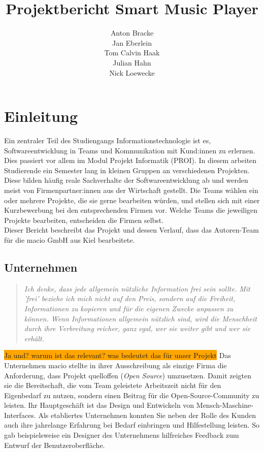 \documentclass[10pt, a4paper]{article}
\title{Projektbericht Smart Music Player}
\author{Anton Bracke\\Jan Eberlein\\Tom Calvin Haak\\Julian Hahn\\Nick Loewecke}
\begin{document}
\maketitle
\newpage
\tableofcontents
\newpage




\section{Einleitung}
Ein zentraler Teil des Studiengangs \glqq Informationstechnologie\grqq{} ist es, Softwareentwicklung in Teams und Kommunikation mit Kund:innen zu erlernen. \cite{Qualifikationsziele_Informationstechnologie}
Dies passiert vor allem im Modul \glqq Projekt Informatik (PROI)\grqq{}.
In diesem arbeiten Studierende ein Semester lang in kleinen Gruppen an verschiedenen Projekten.
Diese bilden häufig reale Sachverhalte der Softwareentwicklung ab und werden meist von Firmenpartner:innen aus der Wirtschaft gestellt.
Die Teams wählen ein oder mehrere Projekte, die sie gerne bearbeiten würden, und stellen sich mit einer Kurzbewerbung bei den entsprechenden Firmen vor.
Welche Teams die jeweiligen Projekte bearbeiten, entscheiden die Firmen selbst.
\\
Dieser Bericht beschreibt das Projekt und dessen Verlauf, dass das Autoren-Team für die macio GmbH aus Kiel bearbeitete.

\subsection{Unternehmen}
\begin{quote}
  \textit{Ich denke, dass jede allgemein nützliche Information frei sein sollte.
  Mit 'frei' beziehe ich mich nicht auf den Preis, sondern auf die Freiheit, Informationen zu kopieren und für die eigenen Zwecke anpassen zu können.
  Wenn Informationen allgemein nützlich sind, wird die Menschheit durch ihre Verbreitung reicher, ganz egal, wer sie weiter gibt und wer sie erhält.}
  \cite{openSource}
\end{quote}

\colorbox{orange}{Ja und? warum ist das relevant? was bedeutet das für unser Projekt}
Das Unternehmen macio stellte in ihrer Ausschreibung als einzige Firma die Anforderung, dass Projekt quelloffen (\textit{Open Source}) umzusetzen.
Damit zeigten sie die Bereitschaft, die vom Team geleistete Arbeitszeit nicht für den Eigenbedarf zu nutzen, sondern einen Beitrag für die Open-Source-Community zu leisten.
Ihr Hauptgeschäft ist das Design und Entwickeln von Mensch-Maschine-Interfaces.
Als etabliertes Unternehmen konnten Sie neben der Rolle des Kunden auch ihre jahrelange Erfahrung bei Bedarf einbringen und Hilfestellung leisten.
So gab beispielsweise ein Designer des Unternehmens hilfreiches Feedback zum Entwurf der Benutzeroberfläche.
\end{document}

